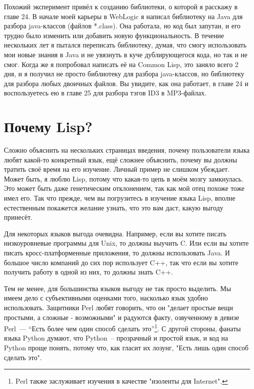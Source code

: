 Похожий эксперимент привёл к созданию библиотеки, о которой я расскажу в главе 24. В
начале моей карьеры в WebLogic я написал библиотеку на Java для разбора java-классов
(файлов *.class). Она работала, но код был запутан, и его трудно было изменить или
добавить новую функциональность. В течение нескольких лет я пытался переписать библиотеку,
думая, что смогу использовать мои новые знания в Java и не увязнуть в куче дублирующегося
кода, но так и не смог. Когда же я попробовал написать её на Common Lisp, это заняло всего
2 дня, и я получил не просто библиотеку для разбора java-классов, но библиотеку для
разбора любых двоичных файлов. Вы увидите, как она работает, в главе 24 и воспользуетесь
ею в главе 25 для разбора тэгов ID3 в MP3-файлах.

\section{Почему Lisp?}

Сложно объяснить на нескольких страницах введения, почему пользователи языка любят
какой-то конкретный язык, ещё сложнее объяснить, почему вы должны тратить своё время на
его изучение. Личный пример не слишком убеждает. Может быть, я люблю Lisp, потому что
какая-то цепь в моём мозгу замкнулась. Это может быть даже генетическим отклонением, так
как мой отец похоже тоже имел его. Так что прежде, чем вы погрузитесь в изучение языка
Lisp, вполне естественным покажется желание узнать, что это вам даст, какую выгоду
принесёт.

Для некоторых языков выгода очевидна. Например, если вы хотите писать низкоуровневые
программы для Unix, то должны выучить C. Или если вы хотите писать кросс-платформенные
приложения, то должны использовать Java. И большое число компаний до сих пор использует
C++, так что если вы хотите получить работу в одной из них, то должны знать C++.

Тем не менее, для большинства языков выгоду не так просто выделить. Мы имеем дело с
субъективными оценками того, насколько язык удобно использовать. Защитники Perl любят
говорить, что он "делает простые вещи простыми, а сложные - возможными" и радуются факту,
озвученному в девизе Perl~--- ``Есть более чем один способ сделать это''\footnote{Perl
  также заслуживает изучения в качестве "изоленты для Internet".}. С другой стороны,
фанаты языка Python думают, что Python~-- прозрачный и простой язык, и код на Python проще
понять, потому что, как гласит их лозунг, "Есть лишь один способ сделать это".

